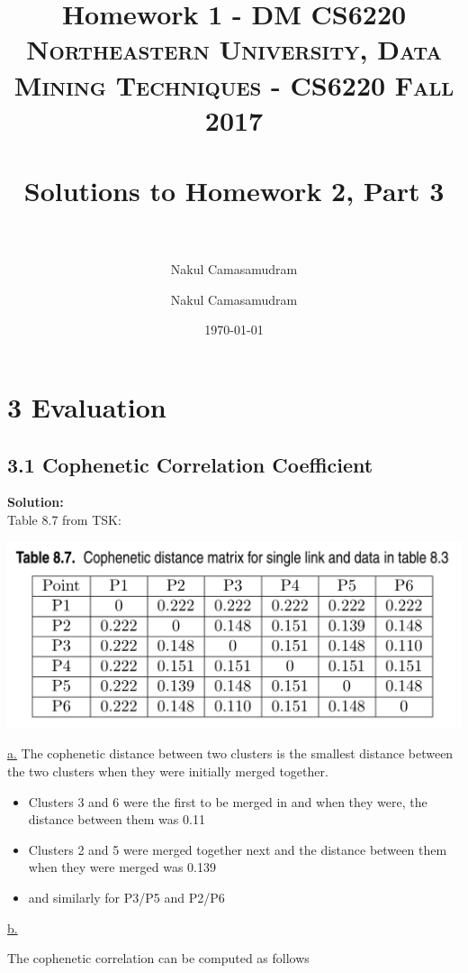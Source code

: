 \documentclass[11pt]{article}
\title{Homework 1 - DM CS6220}
\author{Nakul Camasamudram}
\title{	
	\normalfont \normalsize 
	\textsc{Northeastern University, Data Mining Techniques - CS6220 Fall 2017} \\
	\horrule{0.5pt} \\[0.4cm] %
	\huge Solutions to Homework 2, Part 3 \\ %
	\horrule{2pt} \\[0.5cm] %
	}
\author{Nakul Camasamudram} %
\date{\normalsize\today} %
\begin{document}
	
	\maketitle %
	\newpage
	
	
\section*{3 Evaluation}

\subsection*{3.1 Cophenetic Correlation Coefficient}
\textbf{Solution:}\\
Table 8.7 from TSK: \\
\begin{center}
	\includegraphics[scale=0.2]{table_8_7.jpeg}
\end{center}

\underline{a.}
The cophenetic distance between two clusters is the smallest distance between the two clusters when they were initially merged together.

\begin{itemize}
	\item Clusters 3 and 6 were the first to be merged in and when they were, the distance between them was 0.11
	\item Clusters 2 and 5 were merged together next and the distance between them when they were merged was 0.139
	\item and similarly for P3/P5 and P2/P6
\end{itemize}

\underline{b.}

The cophenetic correlation can be computed as follows
\end{document}
